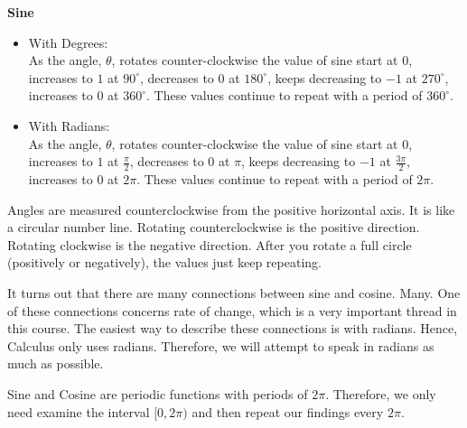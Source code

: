 \documentclass{ximera}
\begin{document}
\begin{idea} \textbf{\textcolor{green!50!black}{Sine}}
\begin{itemize}
\item With Degrees: \\
As the angle, $\theta$, rotates counter-clockwise the value of sine start at $0$, increases to $1$ at $90^\circ$, decreases to $0$ at $180^\circ$, keeps decreasing to $-1$ at $270^\circ$, increases to $0$ at $360^\circ$.  These values continue to repeat with a period of $360^\circ$.

\item With Radians: \\
As the angle, $\theta$, rotates counter-clockwise the value of sine start at $0$, increases to $1$ at $\frac{\pi}{2}$, decreases to $0$ at $\pi$, keeps decreasing to $-1$ at $\frac{3\pi}{2}$, increases to $0$ at $2\pi$.  These values continue to repeat with a period of $2\pi$.
\end{itemize}
\end{idea}



Angles are measured counterclockwise from the positive horizontal axis.  It is like a circular number line.  Rotating counterclockwise is the positive direction.  Rotating clockwise is the negative direction.  After you rotate a full circle (positively or negatively), the values just keep repeating.



\begin{onlineOnly}

\begin{center}
\end{center}

\end{onlineOnly}




\begin{warning}
It turns out that there are many connections between sine and cosine. Many. One of these connections concerns rate of change, which is a very important thread in this course.  The easiest way to describe these connections is with radians. Hence, Calculus only uses radians. Therefore, we will attempt to speak in radians as much as possible.
\end{warning}



Sine and Cosine are periodic functions with periods of $2\pi$. Therefore, we only need examine the interval $[0, 2\pi)$ and then repeat our findings every $2\pi$.
\end{document}
